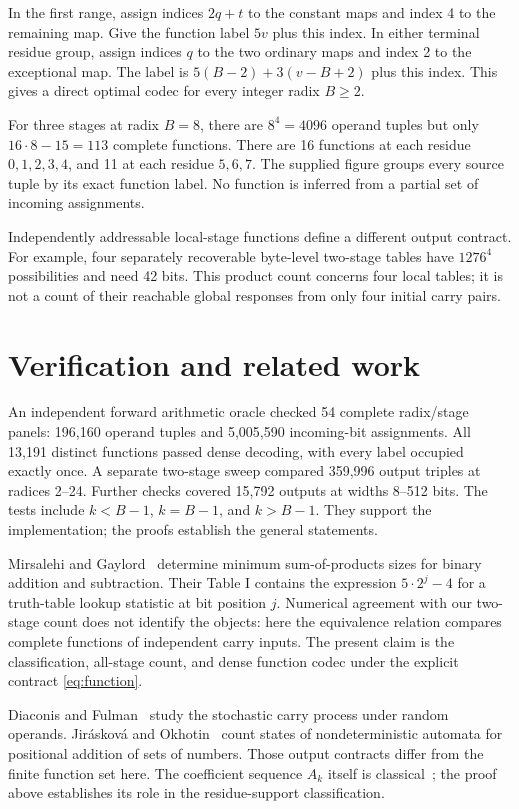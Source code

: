 \documentclass[11pt,a4paper]{article}
\theoremstyle{definition}\newtheorem{definition}[theorem]{Definition}
\begin{document}
In the first range, assign indices $2q+t$ to the constant maps and index 4
to the remaining map. Give the function label $5v$ plus this index.
In either terminal residue group, assign indices $q$ to the two ordinary
maps and index 2 to the exceptional map. The label is
$5(B-2)+3(v-B+2)$ plus this index. This gives a direct optimal codec for
every integer radix $B\geq2$.

For three stages at radix $B=8$, there are $8^4=4096$ operand tuples but
only $16\cdot8-15=113$ complete functions. There are 16 functions at each
residue $0,1,2,3,4$, and 11 at each residue $5,6,7$.
The supplied figure groups every source tuple by its exact function label.
No function is inferred from a partial set of incoming assignments.

Independently addressable local-stage functions define a different output
contract. For example, four separately recoverable byte-level two-stage
tables have $1276^4$ possibilities and need 42 bits. This product count
concerns four local tables; it is not a count of their reachable global
responses from only four initial carry pairs.

\section{Verification and related work}
An independent forward arithmetic oracle checked 54 complete radix/stage
panels: 196,160 operand tuples and 5,005,590 incoming-bit assignments.
All 13,191 distinct functions passed dense decoding, with every label
occupied exactly once. A separate two-stage sweep compared 359,996 output
triples at radices 2--24. Further checks covered 15,792 outputs at widths
8--512 bits. The tests include $k<B-1$, $k=B-1$, and $k>B-1$.
They support the implementation; the proofs establish the general statements.

Mirsalehi and Gaylord~\cite{mirsalehi} determine minimum sum-of-products
sizes for binary addition and subtraction. Their Table I contains the
expression $5\cdot2^j-4$ for a truth-table lookup statistic at bit position
$j$. Numerical agreement with our two-stage count does not identify the
objects: here the equivalence relation compares complete functions of
independent carry inputs. The present claim is the classification,
all-stage count, and dense function codec under the explicit contract
\eqref{eq:function}.

Diaconis and Fulman~\cite{diaconis} study the stochastic carry process
under random operands. Jir\'askov\'a and Okhotin~\cite{jiraskova} count
states of nondeterministic automata for positional addition of sets of
numbers. Those output contracts differ from the finite function set here.
The coefficient sequence $A_k$ itself is classical~\cite{oeis}; the proof
above establishes its role in the residue-support classification.
\end{document}
